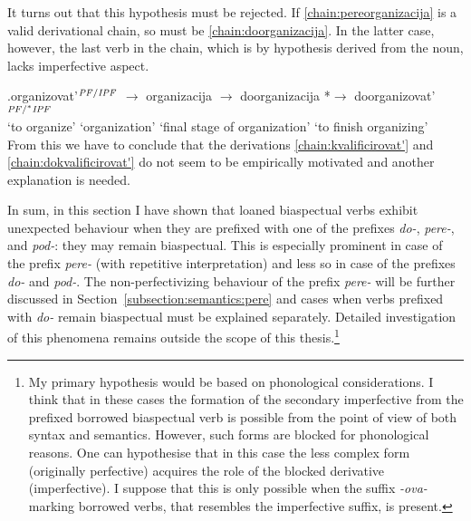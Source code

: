 It turns out that this hypothesis must be rejected. If \ref{chain:pereorganizacija} is a valid derivational chain, so must be \ref{chain:doorganizacija}. In the latter case, however, the last verb in the chain, which is by hypothesis derived from the noun, lacks imperfective aspect. 

\exg.\label{chain:doorganizacija}organizovat'$^{{\mathit{PF}}/{\mathit{IPF}}}$ {$\rightarrow$} organizacija {$\rightarrow$} doorganizacija {*$\rightarrow$} {doorganizovat'$^{{\mathit{PF}}/^*{\mathit{IPF}}}$}\\
{`to organize'} {} `organization' {} {`final stage of organization'} {} {`to finish organizing'}\\

From this we have to conclude that the derivations \ref{chain:kvalificirovat'} and \ref{chain:dokvalificirovat'} do not seem to be empirically motivated and another explanation is needed. 

In sum, in this section I have shown that loaned biaspectual verbs exhibit unexpected behaviour when they are prefixed with one of the prefixes \textit{do-}, \textit{pere-}, and \textit{pod-}: they may remain biaspectual. This is especially prominent in case of the prefix \textit{pere-} (with repetitive interpretation) and less so in case of the prefixes \textit{do-} and \textit{pod-}. The non-perfectivizing behaviour of the prefix \textit{pere-} will be further discussed in Section~\ref{subsection:semantics:pere} and cases when verbs prefixed with \textit{do-} remain biaspectual must be explained separately. Detailed investigation of this phenomena remains outside the scope of this thesis.\footnote{My primary hypothesis would be based on phonological considerations. I think that in these cases the formation of the secondary imperfective from the prefixed borrowed biaspectual verb is possible from the point of view of both syntax and semantics. However, such forms are blocked for phonological reasons. One can hypothesise that in this case the less complex form (originally perfective) acquires the role of the blocked derivative (imperfective). I suppose that this is only possible when the suffix \textit{-ova-} marking borrowed verbs, that resembles the imperfective suffix, is present.}
	

